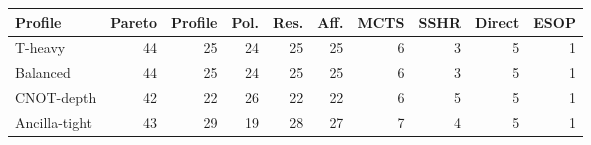 \begin{tabular}{@{}lrrrrrrrrr@{}}
\toprule
Profile & Pareto & Profile & Pol. & Res. & Aff. & MCTS & SSHR & Direct & ESOP \\
\midrule
T-heavy & 44 & 25 & 24 & 25 & 25 & 6 & 3 & 5 & 1 \\
Balanced & 44 & 25 & 24 & 25 & 25 & 6 & 3 & 5 & 1 \\
CNOT-depth & 42 & 22 & 26 & 22 & 22 & 6 & 5 & 5 & 1 \\
Ancilla-tight & 43 & 29 & 19 & 28 & 27 & 7 & 4 & 5 & 1 \\
\bottomrule
\end{tabular}
